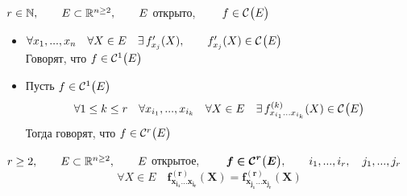\begin{definition}
	$ r \in \N, \qquad E \sub \R^{n \ge 2}, \qquad E $ открыто, $ \qquad f \in \Cont{E} $
	\begin{itemize}
		\item $ \forall x_1, ..., x_n \quad \forall X \in E \quad \exist f_{x_j}'(X), \qquad f_{x_j}'(X) \in \Cont{E} $ \\
		Говорят, что $ f \in \Cont[1]E $
		\item Пусть $ f \in \Cont[1]{E} $
		$$ \forall 1 \le k \le r \quad \forall x_{i_1}, ..., x_{i_k} \quad \forall X \in E \quad \exist f_{x_{i_1} \dots x_{i_k}}^{(k)}(X) \in \Cont{E} $$
		Тогда говорят, что $ f \in \Cont[r]{E} $
	\end{itemize}
\end{definition}

\begin{theorem}
	$ r \ge 2, \qquad E \sub \R^{n \ge 2}, \qquad E $ открытое, $ \qquad \bm{f \in \Cont[r]{E}}, \qquad i_1, ..., i_r, \quad j_1, ..., j_r $
	$$ \forall X \in E \quad \bm{f_{x_{i_1} \dots x_{i_r}}^{(r)}(X) = f_{x_{j_1} \dots x_{j_r}}^{(r)}(X)} $$
\end{theorem}

